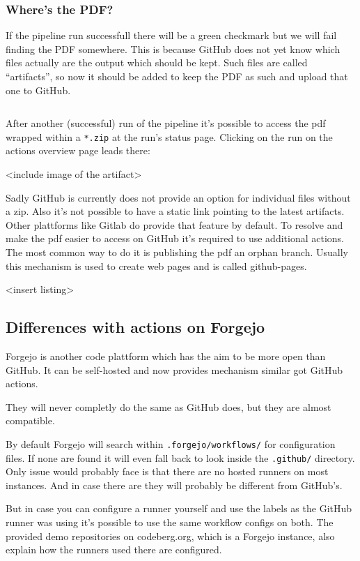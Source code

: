 \documentclass[final]{ltugboat}
\newcommand*{\file}[1]{\texttt{#1}}
\newcommand*{\directory}[1]{\texttt{#1}}
\begin{document}
\subsubsection{Where's the PDF?}
If the pipeline run successfull there will be a green checkmark but we will fail finding the PDF somewhere.
This is because GitHub does not yet know which files actually are the output which should be kept.
Such files are called \enquote{artifacts}, so now it should be added to keep the PDF as such and upload that one to GitHub.

\inputminted[firstline=13, lastline=17,gobble=3]{yaml}{examples/latex-basic.yml}

After another (successful) run of the pipeline it's possible to access the pdf wrapped within a  \file{*.zip} at the run's status page.
Clicking on the run on the actions overview page leads there:

<include image of the artifact>

Sadly GitHub is currently does not provide an option for individual files without a zip.
Also it's not possible to have a static link pointing to the latest artifacts.
Other plattforms like Gitlab do provide that feature by default.
To resolve and make the pdf easier to access on GitHub it's required to use additional actions.
The most common way to do it is publishing the pdf an orphan branch.
Usually this mechanism is used to create web pages and is called github-pages.

<insert listing>

\subsection{Differences with actions on Forgejo}
Forgejo\cite{forgejo} is another code plattform which has the aim to be more open than GitHub.
It can be self-hosted and now provides mechanism similar got GitHub actions.

They will never completly do the same as GitHub does, but they are almost compatible.

By default Forgejo will search within \directory{.forgejo/workflows/} for configuration files.
If none are found it will even fall back to look inside the \directory{.github/} directory.
Only issue would probably face is that there are no hosted runners on most instances.
And in case there are they will probably be different from GitHub's.

But in case you can configure a runner yourself and use the labels as the GitHub runner \cite[described in]{forgejo-runner-config} was using it's possible to use the same workflow configs on both.
The provided demo repositories on codeberg.org, which is a Forgejo instance, also explain how the runners used there are configured.
\end{document}
